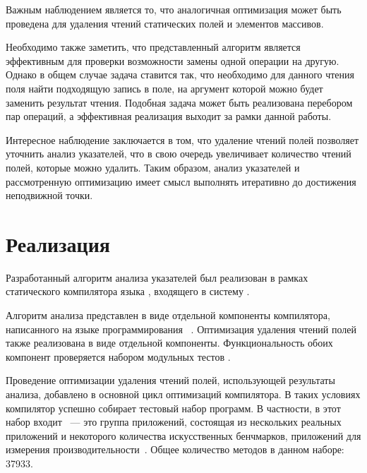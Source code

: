 \documentclass[14pt,titlepage,draft]{extarticle}
\newcommand{\java}{\eng{Java}\xspace}
\begin{document}
    Важным наблюдением является то, что аналогичная оптимизация может быть
    проведена для удаления чтений статических полей и элементов массивов.

    Необходимо также заметить, что представленный алгоритм является эффективным
    для проверки возможности замены одной операции на другую. Однако в общем
    случае задача ставится так, что необходимо для данного чтения поля найти
    подходящую запись в поле, на аргумент которой можно будет заменить
    результат чтения. Подобная задача может быть реализована перебором пар
    операций, а эффективная реализация выходит за рамки данной работы.

    Интересное наблюдение заключается в том, что удаление чтений полей позволяет
    уточнить анализ указателей, что в свою очередь увеличивает количество
    чтений полей, которые можно удалить. Таким образом, анализ указателей и
    рассмотренную оптимизацию имеет смысл выполнять итеративно до
    достижения неподвижной точки.

  \section{Реализация}

    Разработанный алгоритм анализа указателей был реализован в рамках
    статического компилятора языка \java, входящего в систему .

    Алгоритм анализа представлен в виде отдельной компоненты компилятора,
    написанного на языке программирования ~\cite{scala_lang}.
    Оптимизация удаления чтений полей также реализована в виде отдельной
    компоненты. Функциональность обоих компонент проверяется набором модульных
    тестов .

    Проведение оптимизации удаления чтений полей, использующей результаты
    анализа, добавлено в основной цикл оптимизаций компилятора.
    В таких условиях компилятор успешно собирает тестовый набор \java программ.
    В частности, в этот набор входит ~--- это группа
    приложений, состоящая из нескольких реальных приложений и некоторого
    количества искусственных бенчмарков, приложений для измерения
    производительности~\cite{spec_jvm2008}. Общее количество методов в данном
    наборе: \num{37933}.
\end{document}

